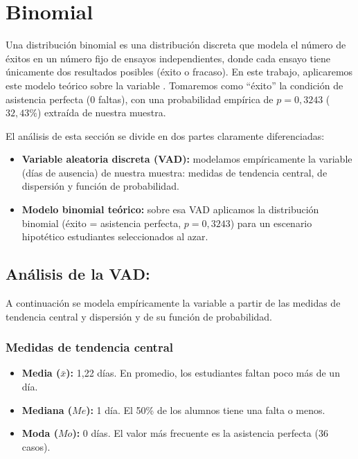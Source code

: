 \section{Binomial}
Una distribución binomial es una distribución discreta que modela el número de éxitos en un número
fijo de ensayos independientes, donde cada ensayo tiene únicamente dos resultados posibles (éxito
o fracaso). En este trabajo, aplicaremos este modelo teórico sobre la variable
. Tomaremos como ``éxito'' la condición de asistencia perfecta (0 faltas),
con una probabilidad empírica de \(p = 0{,}3243\) (\(32{,}43\%\)) extraída de nuestra muestra.

El análisis de esta sección se divide en dos partes claramente diferenciadas:

\begin{itemize}
  \item \textbf{Variable aleatoria discreta (VAD):} modelamos empíricamente la variable
   (días de ausencia) de nuestra muestra: medidas de tendencia central,
  de dispersión y función de probabilidad.
  \item \textbf{Modelo binomial teórico:} sobre esa VAD aplicamos la distribución binomial
  (éxito = asistencia perfecta, $p = 0{,}3243$) para un escenario hipotético
  estudiantes seleccionados al azar.
\end{itemize}

\subsection{Análisis de la VAD: \texorpdfstring{}{absence\_days}}
A continuación se modela empíricamente la variable  a
partir de las medidas de tendencia central y dispersión y de su función de probabilidad.

\subsubsection{Medidas de tendencia central}
\begin{itemize}
	\item \textbf{Media ($\bar{x}$):} 1,22 días. En promedio, los estudiantes faltan poco más de un día.
	\item \textbf{Mediana ($Me$):} 1 día. El 50\% de los alumnos tiene una falta o menos.
	\item \textbf{Moda ($Mo$):} 0 días. El valor más frecuente es la asistencia perfecta (36 casos).
\end{itemize}

